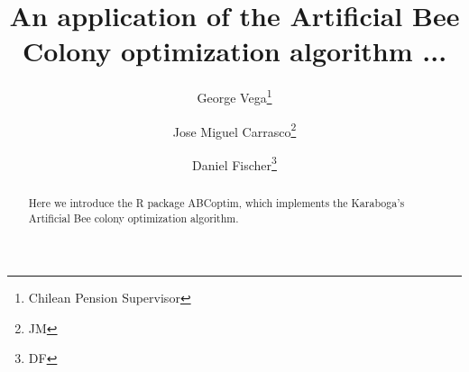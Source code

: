 \documentclass{article}
\title{An application of the Artificial Bee Colony optimization algorithm ...}
\author{
George Vega\thanks{Chilean Pension Supervisor} \and
Jose Miguel Carrasco\thanks{JM} \and
Daniel Fischer\thanks{DF}
}
\begin{document}
\maketitle

\begin{abstract}
Here we introduce the R package ABCoptim, which implements the Karaboga's 
Artificial Bee colony optimization algorithm.
\end{abstract}
\end{document}
